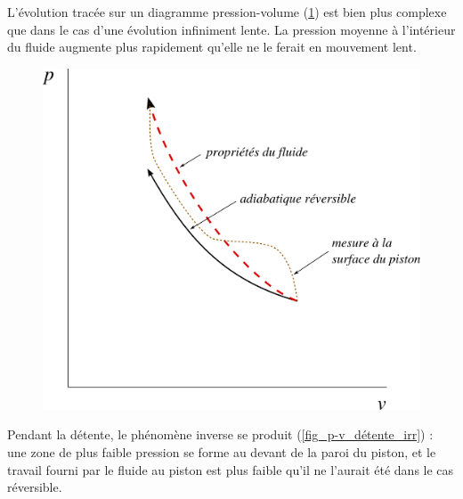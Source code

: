 		\clearfloats %

		L’évolution tracée sur un diagramme pression-volume (\cref{fig_p-v_compression_irr}) est bien plus complexe que dans le cas d’une évolution infiniment lente. La pression moyenne à l’intérieur du fluide augmente plus rapidement qu’elle ne le ferait en mouvement lent.

		\begin{figure}
			\begin{center}
				\includegraphics[width=\textwidth]{images/pv_compression_irreversible.png}
			\end{center}
			\label{fig_p-v_compression_irr}
		\end{figure}

		Pendant la détente, le phénomène inverse se produit (\cref{fig_p-v_détente_irr}) : une zone de plus faible pression se forme au devant de la paroi du piston, et le travail fourni par le fluide au piston est plus faible qu’il ne l’aurait été dans le cas réversible.


